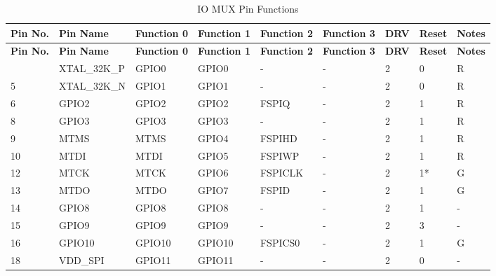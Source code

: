 
   \begin{longtable}[c]{|p{0.7cm}|p{1.9cm}|p{1.9cm}|p{1.7cm}|p{1.7cm}|p{1.7cm}|p{1cm}|p{1cm}|p{1.0cm}| }
   \caption{IO MUX Pin Functions}
    \label{tab:iomuxgpio-pin-functions} \\
        \hline
        \rowcolor{lightgray}
\textbf{Pin No.} & \textbf{Pin Name} & \textbf{Function 0} & \textbf{Function 1} & \textbf{Function 2} & \textbf{Function 3} & \textbf{DRV} & \textbf{Reset} & \textbf{Notes} \\
 \hline
\endfirsthead
        \hline
        \rowcolor{lightgray}
        \textbf{Pin No.} & \textbf{Pin Name} & \textbf{Function 0} & \textbf{Function 1} & \textbf{Function 2} & \textbf{Function 3} & \textbf{DRV} & \textbf{Reset} & \textbf{Notes} \\
        \hline
        \endhead
        \endfoot
4 & XTAL\_32K\_P     & GPIO0         & GPIO0   & -          & -            & 2           & 0 & R \\ \hline
5 & XTAL\_32K\_N     & GPIO1         & GPIO1   & -          & -            & 2           & 0 & R \\ \hline
6 & GPIO2            & GPIO2         & GPIO2   & FSPIQ      & -            & 2           & 1 & R \\ \hline
8 & GPIO3            & GPIO3         & GPIO3   & -          & -            & 2           & 1 & R \\ \hline
9 & MTMS             & MTMS          & GPIO4   & FSPIHD     & -            & 2           & 1 & R \\ \hline
10 & MTDI             & MTDI          & GPIO5   & FSPIWP     & -            & 2           & 1 & R \\ \hline
12 & MTCK             & MTCK          & GPIO6   & FSPICLK    & -            & 2           & 1* & G \\ \hline
13 & MTDO             & MTDO          & GPIO7   & FSPID      & -            & 2           & 1 & G \\ \hline
14 & GPIO8            & GPIO8         & GPIO8   & -          & -            & 2           & 1 & - \\ \hline
15 & GPIO9            & GPIO9         & GPIO9   & -          & -            & 2           & 3 & - \\ \hline
16 & GPIO10          &  GPIO10       & GPIO10  & FSPICS0    & -            & 2           & 1 & G \\ \hline
18 & VDD\_SPI        &  GPIO11       & GPIO11  & -          & -            & 2           & 0 & - \\ \hline

\end{longtable}
